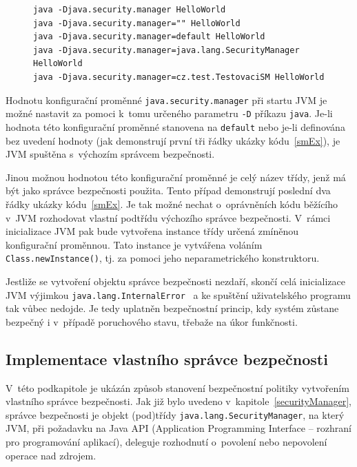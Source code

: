 \begin{figure}[b!]
\begin{lstlisting}[caption=Příkazy spouštějící program s~výchozím správcem bezpečnosti, label=smEx]
java -Djava.security.manager HelloWorld
java -Djava.security.manager="" HelloWorld
java -Djava.security.manager=default HelloWorld
java -Djava.security.manager=java.lang.SecurityManager HelloWorld
java -Djava.security.manager=cz.test.TestovaciSM HelloWorld
\end{lstlisting}
\end{figure}

Hodnotu konfigurační proměnné {\tt java.security.manager} při startu JVM je možné nastavit za pomoci k~tomu určeného parametru {\tt -D} příkazu {\tt java}.
Je-li hodnota této konfigurační proměnné stanovena na {\tt default} nebo je-li definována bez uvedení hodnoty
(jak demonstrují první tři řádky ukázky kódu~\ref{smEx}), je JVM spuštěna s~výchozím správcem bezpečnosti.
\cite{javaSecurityArch}

Jinou možnou hodnotou této konfigurační proměnné je celý název třídy, jenž má být jako správce bezpečnosti použita.
Tento případ demonstrují poslední dva řádky ukázky kódu~\ref{smEx}.
Je tak možné nechat o~oprávněních kódu běžícího v~JVM rozhodovat vlastní podtřídu výchozího správce bezpečnosti.
V~rámci inicializace JVM pak bude vytvořena instance třídy určená zmíněnou konfigurační proměnnou.
Tato instance je vytvářena voláním {\tt Class.newInstance()}, tj. za pomoci jeho neparametrického konstruktoru.

Jestliže se vytvoření objektu správce bezpečnosti nezdaří, skončí celá inicializace JVM výjimkou {\tt java.lang.InternalError}~\cite{sourceLauncher} a ke spuštění uživatelského programu tak vůbec nedojde.
Je tedy uplatněn bezpečnostní princip, kdy systém zůstane bezpečný i v~případě poruchového stavu, třebaže na úkor funkčnosti.

\subsection{Implementace vlastního správce bezpečnosti} \label{vlastniSM}

V~této podkapitole je ukázán způsob stanovení bezpečnostní politiky vytvořením vlastního správce bezpečnosti.
Jak již bylo uvedeno v~kapitole~\ref{securityManager}, správce bezpečnosti je objekt (pod)třídy {\tt java.lang.SecurityManager},
na který JVM, při požadavku na Java API (Application Programming Interface -- rozhraní pro programování aplikací), deleguje rozhodnutí o~povolení nebo nepovolení operace nad zdrojem.


